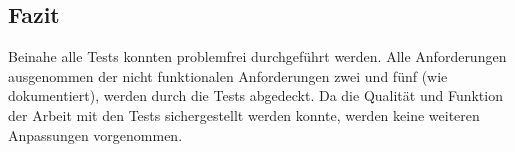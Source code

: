 \subsection{Fazit}
Beinahe alle Tests konnten problemfrei durchgeführt werden. Alle Anforderungen ausgenommen der nicht funktionalen Anforderungen zwei und fünf (wie dokumentiert),
werden durch die Tests abgedeckt. Da die Qualität und Funktion der Arbeit mit den Tests sichergestellt werden konnte, werden keine weiteren 
Anpassungen vorgenommen.
